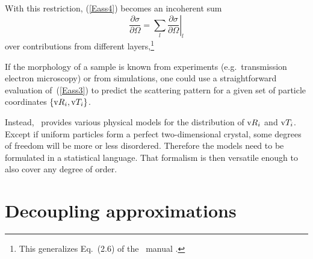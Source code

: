 With this restriction, (\ref{Eass4}) becomes an incoherent sum
\begin{equation}
  \frac{\partial\sigma}{\partial\Omega}
  = \sum_{l} \left.\frac{\partial\sigma}{\partial\Omega}\right|_l
\end{equation}
over contributions from different layers,\footnote
{This generalizes Eq.~(2.6) of the \IsGISAXS\ manual \cite{Laz08}.}

If the morphology of a sample is known from experiments
(e.g.\ transmission electron microscopy) or from simulations,
one could use a straightforward evaluation of~(\ref{Eass3})
to predict the scattering pattern
for a given set of particle coordinates $\{\text{v}{R}_i,\text{v}{T}_i\}$.

\addtocounter{footnote}{1}

Instead, \BornAgain\ provides various physical models
for the distribution of $\text{v}{R}_i$ and $\text{v}{T}_i$.
Except if uniform particles form a perfect two-dimensional crystal,
some degrees of freedom will be more or less disordered.
Therefore the models need to be formulated in a statistical language.
That formalism is then versatile enough to also cover any degree of order.

\section{Decoupling approximations}\label{Spartidis}

